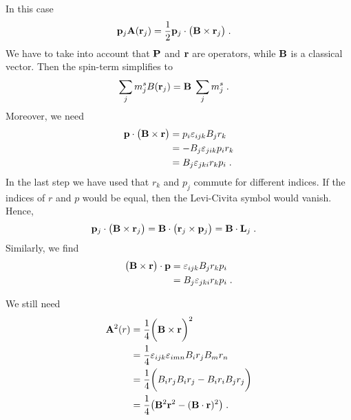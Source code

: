 %
In this case 
%
\begin{align*}
\mathbf p_{j} \mathbf A(\mathbf r_{j}) &= 
\frac{1}{2}\mathbf p_{j} \cdot \big(\mathbf B\times \mathbf r_{j}\big)\;.
\end{align*}
%
We have to take into account that $\mathbf P$ and $\mathbf r$ are operators, while 
$\mathbf B$ is a classical vector. Then the spin-term simplifies to
%
\begin{align*}
\sum_{j}  m^{s}_{j}B(\mathbf r_{j}) &= \mathbf B \;\sum_{j} m^{s}_{j}\;.
\end{align*}
%
Moreover, we need
%
\begin{align*}
\mathbf p\cdot \big( \mathbf B\times \mathbf r \big) 
&=p_{i} \varepsilon_{ijk} B_{j} r_{k}\\
&=-B_{j}  \varepsilon_{jik} p_{i} r_{k}\\
&=B_{j}  \varepsilon_{jki} r_{k} p_{i} \;.
\end{align*}
%
In the last step we have used that $r_{k}$ and $p_{j}$ commute for different indices. If the indices of $r$ and $p$ would be equal, then the Levi-Civita symbol would vanish.
Hence,
%
\begin{align}\label{eq:}
\mathbf p_{j}\cdot \big( \mathbf B\times \mathbf r_{j} \big)  &=
\mathbf B\cdot \big( \mathbf r_{j}\times \mathbf p_{j}\big) =\mathbf B \cdot \mathbf L_{j}\;.
\end{align}
%
Similarly, we find
\begin{align*}
\big( \mathbf B\times \mathbf r \big) \cdot \mathbf p
&= \varepsilon_{ijk} B_{j} r_{k}p_{i}\\
&=B_{j}  \varepsilon_{jki} r_{k} p_{i} \;.
\end{align*}

We still need 
%
\begin{align*}
\mathbf A^{2}(r) &= \frac{1}{4} \bigg( \mathbf B \times \mathbf r \bigg)^{2}\\
&=\frac{1}{4}\varepsilon_{ijk}\varepsilon_{imn} B_{i} r_{j} 
B_{m}r_{n}\\
&=\frac{1}{4}\bigg(B_{i} r_{j} B_{i}r_{j}
-B_{i} r_{i} B_{j}r_{j}\bigg)\\
&=\frac{1}{4}\big(\mathbf B^{2}\mathbf r^{2} -(\mathbf B\cdot \mathbf r)^{2}\big)\;.
\end{align*}
%

